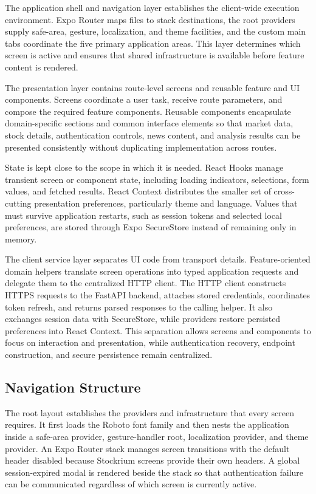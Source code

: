 The application shell and navigation layer establishes the client-wide execution environment. Expo Router maps files to stack destinations, the root providers supply safe-area, gesture, localization, and theme facilities, and the custom main tabs coordinate the five primary application areas. This layer determines which screen is active and ensures that shared infrastructure is available before feature content is rendered.

The presentation layer contains route-level screens and reusable feature and UI components. Screens coordinate a user task, receive route parameters, and compose the required feature components. Reusable components encapsulate domain-specific sections and common interface elements so that market data, stock details, authentication controls, news content, and analysis results can be presented consistently without duplicating implementation across routes.

State is kept close to the scope in which it is needed. React Hooks manage transient screen or component state, including loading indicators, selections, form values, and fetched results. React Context distributes the smaller set of cross-cutting presentation preferences, particularly theme and language. Values that must survive application restarts, such as session tokens and selected local preferences, are stored through Expo SecureStore instead of remaining only in memory.

The client service layer separates UI code from transport details. Feature-oriented domain helpers translate screen operations into typed application requests and delegate them to the centralized HTTP client. The HTTP client constructs HTTPS requests to the FastAPI backend, attaches stored credentials, coordinates token refresh, and returns parsed responses to the calling helper. It also exchanges session data with SecureStore, while providers restore persisted preferences into React Context. This separation allows screens and components to focus on interaction and presentation, while authentication recovery, endpoint construction, and secure persistence remain centralized.

\subsection{Navigation Structure}
\label{subsec:mobile-navigation-structure}

The root layout establishes the providers and infrastructure that every screen requires. It first loads the Roboto font family and then nests the application inside a safe-area provider, gesture-handler root, localization provider, and theme provider. An Expo Router stack manages screen transitions with the default header disabled because Stockrium screens provide their own headers. A global session-expired modal is rendered beside the stack so that authentication failure can be communicated regardless of which screen is currently active.

